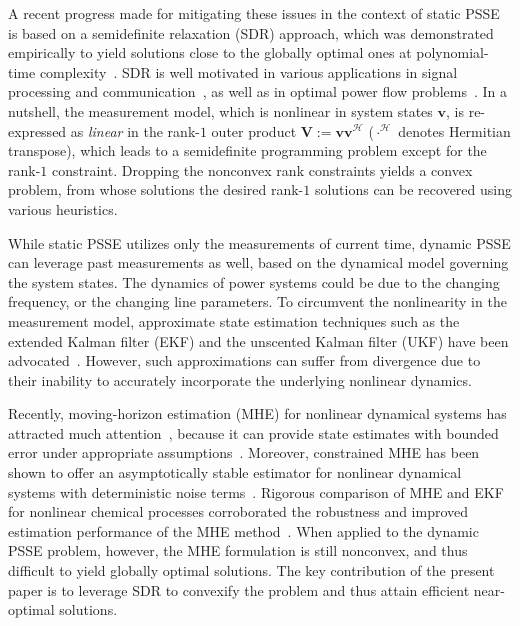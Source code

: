 \documentclass[conference]{IEEEtran}
\def\ccalH{{\ensuremath{\mathcal H}}}
\def\bbV{{\ensuremath{\mathbf V}}}
\def\bbv{{\ensuremath{\mathbf v}}}
\begin{document}
A recent progress made for mitigating these issues in the context of static PSSE is based on a semidefinite relaxation (SDR) approach, which was demonstrated empirically to yield solutions close to the globally optimal ones at polynomial-time complexity~\cite{naps:zhu2011}. SDR is well motivated in various applications in signal processing and communication~\cite{spm:luo2010}, as well as in optimal power flow problems~\cite{bai2008, tps:low2012, tsm:dall2013}. In a nutshell, the measurement model, which is nonlinear in system states $\bbv$, is re-expressed as {\em linear} in the rank-$1$ outer product $\bbV\! :=\! \bbv \bbv^\ccalH$ ($\cdot^\ccalH$ denotes Hermitian transpose), which leads to a semidefinite programming problem except for the rank-$1$ constraint. Dropping the nonconvex rank constraints yields a convex problem, from whose solutions the desired rank-$1$ solutions can be recovered using various heuristics.




While static PSSE utilizes only the measurements of current time, dynamic PSSE can leverage past measurements as well, based on the dynamical model governing the system states. The dynamics of power systems could be due to the changing frequency, or the changing line parameters. To circumvent the nonlinearity in the measurement model, approximate state estimation techniques such as the extended Kalman filter (EKF) and the unscented Kalman filter (UKF) have been advocated~\cite{HuS02, Val11}. However, such approximations can suffer from divergence due to their inability to accurately incorporate the underlying nonlinear dynamics.





Recently, moving-horizon estimation (MHE) for nonlinear dynamical systems has attracted much attention~\cite{auto:alessandri2008}, because it can provide state estimates with bounded error under appropriate assumptions~\cite{auto:alessandri2008}. Moreover, constrained MHE has been shown to offer an asymptotically stable estimator for nonlinear dynamical systems with deterministic noise terms~\cite{tac:rao2003}. Rigorous comparison of MHE and EKF for nonlinear chemical processes corroborated the robustness and improved estimation performance of the MHE method~\cite{haseltine2005critical}. When applied to the dynamic PSSE problem, however, the MHE formulation is still nonconvex, and thus difficult to yield globally optimal solutions. The key contribution of the present paper is to leverage SDR to convexify the problem and thus attain efficient near-optimal solutions.
\end{document}
